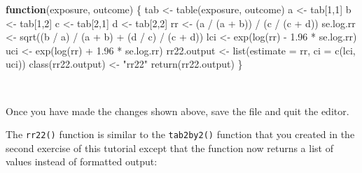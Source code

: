 \documentclass[
  12pt,
  a4paper]{book}
\newenvironment{Shaded}{\begin{snugshade}}{\end{snugshade}}
\newcommand{\AttributeTok}[1]{\textcolor[rgb]{0.77,0.63,0.00}{#1}}
\newcommand{\ControlFlowTok}[1]{\textcolor[rgb]{0.13,0.29,0.53}{\textbf{#1}}}
\newcommand{\DecValTok}[1]{\textcolor[rgb]{0.00,0.00,0.81}{#1}}
\newcommand{\FloatTok}[1]{\textcolor[rgb]{0.00,0.00,0.81}{#1}}
\newcommand{\FunctionTok}[1]{\textcolor[rgb]{0.00,0.00,0.00}{#1}}
\newcommand{\NormalTok}[1]{#1}
\newcommand{\OtherTok}[1]{\textcolor[rgb]{0.56,0.35,0.01}{#1}}
\newcommand{\SpecialCharTok}[1]{\textcolor[rgb]{0.00,0.00,0.00}{#1}}
\newcommand{\StringTok}[1]{\textcolor[rgb]{0.31,0.60,0.02}{#1}}
\begin{document}
\begin{Shaded}
\begin{Highlighting}[]
\ControlFlowTok{function}\NormalTok{(exposure, outcome) \{}
\NormalTok{  tab }\OtherTok{\textless{}{-}} \FunctionTok{table}\NormalTok{(exposure, outcome)}
\NormalTok{  a }\OtherTok{\textless{}{-}}\NormalTok{ tab[}\DecValTok{1}\NormalTok{,}\DecValTok{1}\NormalTok{]}
\NormalTok{  b }\OtherTok{\textless{}{-}}\NormalTok{ tab[}\DecValTok{1}\NormalTok{,}\DecValTok{2}\NormalTok{]}
\NormalTok{  c }\OtherTok{\textless{}{-}}\NormalTok{ tab[}\DecValTok{2}\NormalTok{,}\DecValTok{1}\NormalTok{]}
\NormalTok{  d }\OtherTok{\textless{}{-}}\NormalTok{ tab[}\DecValTok{2}\NormalTok{,}\DecValTok{2}\NormalTok{]}
\NormalTok{  rr }\OtherTok{\textless{}{-}}\NormalTok{ (a }\SpecialCharTok{/}\NormalTok{ (a }\SpecialCharTok{+}\NormalTok{ b)) }\SpecialCharTok{/}\NormalTok{ (c }\SpecialCharTok{/}\NormalTok{ (c }\SpecialCharTok{+}\NormalTok{ d))}
\NormalTok{  se.log.rr }\OtherTok{\textless{}{-}} \FunctionTok{sqrt}\NormalTok{((b }\SpecialCharTok{/}\NormalTok{ a) }\SpecialCharTok{/}\NormalTok{ (a }\SpecialCharTok{+}\NormalTok{ b) }\SpecialCharTok{+}\NormalTok{ (d }\SpecialCharTok{/}\NormalTok{ c) }\SpecialCharTok{/}\NormalTok{ (c }\SpecialCharTok{+}\NormalTok{ d))}
\NormalTok{  lci }\OtherTok{\textless{}{-}} \FunctionTok{exp}\NormalTok{(}\FunctionTok{log}\NormalTok{(rr) }\SpecialCharTok{{-}} \FloatTok{1.96} \SpecialCharTok{*}\NormalTok{ se.log.rr)}
\NormalTok{  uci }\OtherTok{\textless{}{-}} \FunctionTok{exp}\NormalTok{(}\FunctionTok{log}\NormalTok{(rr) }\SpecialCharTok{+} \FloatTok{1.96} \SpecialCharTok{*}\NormalTok{ se.log.rr)}
\NormalTok{  rr22.output }\OtherTok{\textless{}{-}} \FunctionTok{list}\NormalTok{(}\AttributeTok{estimate =}\NormalTok{ rr, }\AttributeTok{ci =} \FunctionTok{c}\NormalTok{(lci, uci))}
  \FunctionTok{class}\NormalTok{(rr22.output) }\OtherTok{\textless{}{-}} \StringTok{"rr22"}
  \FunctionTok{return}\NormalTok{(rr22.output)}
\NormalTok{\}}
\end{Highlighting}
\end{Shaded}

~

Once you have made the changes shown above, save the file and quit the editor.

The \texttt{rr22()} function is similar to the \texttt{tab2by2()} function that you created in the second exercise of this
tutorial except that the function now returns a list of values instead of formatted output:

~
\end{document}
